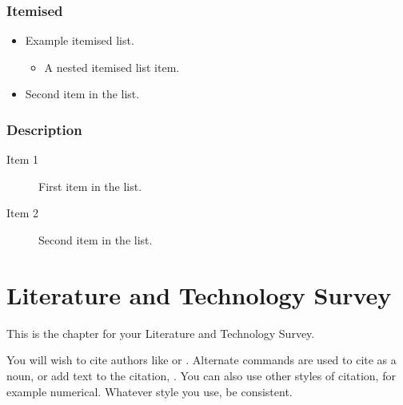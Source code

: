 \documentclass[12pt,a4paper]{report}
\begin{document}
\subsection{Itemised}

\begin{itemize}
\item Example itemised list.
  \begin{itemize}
  \item A nested itemised list item.
  \end{itemize}
\item Second item in the list.
\end{itemize}

\subsection{Description}

\begin{description}
\item[Item 1]First item in the list.
\item[Item 2]Second item in the list.
\end{description}

\chapter{Literature and Technology Survey}

This is the chapter for your Literature and Technology Survey.

You will wish to cite authors like \citep{Brun:03:Atomic-C:oz} or \citep{Stra:17:Combinat:qf}. Alternate
commands are used to cite \citet{Brun:03:Atomic-C:oz} as a noun, or add text to the citation, \citep[\emph{e.g.},][]{Stra:17:Combinat:qf}. You can also use other styles of citation, for example numerical. Whatever style you use, be consistent.


\end{document}
